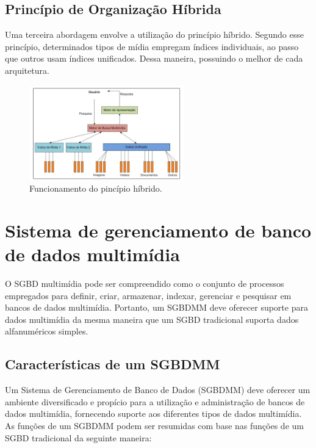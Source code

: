 \documentclass[12pt]{article}
\begin{document}
	\vspace{15em}
	
	\subsection{Princípio de Organização Híbrida}
	Uma terceira abordagem envolve a utilização do princípio híbrido. Segundo esse princípio, determinados tipos de mídia empregam índices individuais, ao passo que outros usam índices unificados. Dessa maneira, possuindo o melhor de cada arquitetura.
	
	\begin{figure}[ht]
		\centering
		\includegraphics[width=0.6\textwidth]{híbrido.png}
		\caption{Funcionamento do pincípio híbrido.}
		\label{fig3:exemplo3}
	\end{figure}
	
	
	\section{Sistema de gerenciamento de banco de dados multimídia}
	
	O SGBD multimídia pode ser compreendido como o conjunto de processos empregados para definir, criar, armazenar, indexar, gerenciar e pesquisar em bancos de dados multimídia. Portanto, um   SGBDMM deve oferecer suporte para dados multimídia da mesma maneira que um SGBD tradicional suporta dados alfanuméricos simples.
	
	\subsection{Características de um SGBDMM}
	
	Um Sistema de Gerenciamento de Banco de Dados (SGBDMM) deve oferecer um ambiente diversificado e propício para a utilização e administração de bancos de dados multimídia, fornecendo suporte aos diferentes tipos de dados multimídia. As funções de um SGBDMM podem ser resumidas com base nas funções de um SGBD tradicional da seguinte maneira:
	
\end{document}
